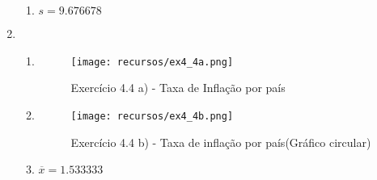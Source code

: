 \documentclass[11pt,a4paper]{report}
\begin{document}
\begin{enumerate}[label=\arabic{chapter}.\arabic*]
\begin{enumerate}[label=\alph*)]
		\item $s = 9.676678$
		\end{enumerate}
	\clearpage
	\item {}\hfill
		\begin{enumerate}[label=\alph*)]
		\item \hfill
			\begin{figure}[h!]
				\centering
				\texttt{[image: recursos/ex4\_4a.png]}
				\caption{Exercício 4.4 a) - Taxa de Inflação por país}
			\end{figure}
			
		\clearpage
		\item \hfill
			\begin{figure}[h!]
				\centering
				\texttt{[image: recursos/ex4\_4b.png]}
				\caption{Exercício 4.4 b) - Taxa de inflação por país(Gráfico
				circular)}
			\end{figure}
			
		\item $\overline{x} = 1.533333$\hfill
			
		\end{enumerate}
\end{enumerate}

\clearpage
\begingroup
\let\clearpage\relax
\printbibliography[heading=bibintoc,title={Bibliografia}]
\listoftables{}
\listoffigures{}
\endgroup
\end{document}
